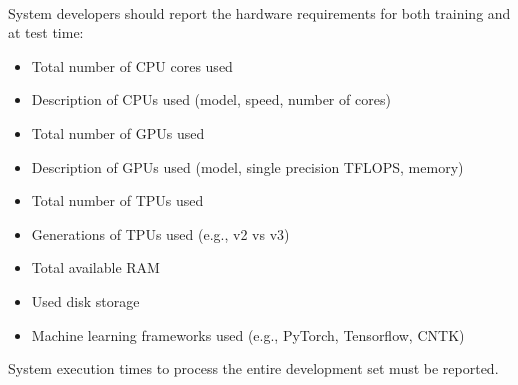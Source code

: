 \documentclass{article}
\begin{document}
\begin{appendices}
\vspace{0.5cm}
 \\
System developers should report the hardware requirements for both training and at test time:
\begin{itemize}
    \item Total number of CPU cores used
    \item Description of CPUs used (model, speed, number of cores)
    \item Total number of GPUs used
    \item Description of GPUs used (model, single precision TFLOPS, memory)
    \item Total number of TPUs used
    \item Generations of TPUs used (e.g., v2 vs v3)
    \item Total available RAM
    \item Used disk storage
    \item Machine learning frameworks used (e.g., PyTorch, Tensorflow, CNTK)
\end{itemize}

System execution times to process the entire development set must be reported.



\end{appendices}
\end{document}
